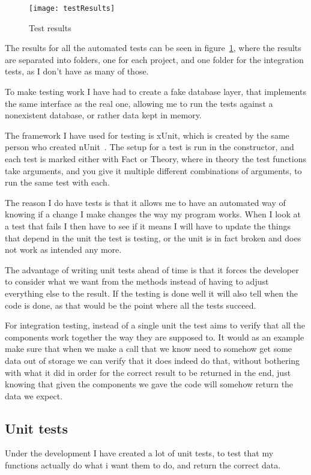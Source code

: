 \begin{figure}[h]
  \centering
  \texttt{[image: testResults]}
  \caption{Test results}
\label{fig:testResults}
\end{figure}

The results for all the automated tests can be seen in
figure~\ref{fig:testResults}, where the results are separated into folders, one
for each project, and one folder for the integration tests, as I don't have as
many of those.

To make testing work I have had to create a fake database layer, that implements
the same interface as the real one, allowing me to run the tests against a
nonexistent database, or rather data kept in memory.

The framework I have used for testing is xUnit, which is created by the same
person who created nUnit~\cite{xunit}. The setup for a test is run in the
constructor, and each test is marked either with Fact or Theory, where in theory
the test functions take arguments, and you give it multiple different
combinations of arguments, to run the same test with each.

The reason I do have tests is that it allows me to have an automated way of
knowing if a change I make changes the way my program works. When I look at a
test that fails I then have to see if it means I will have to update the things
that depend in the unit the test is testing, or the unit is in fact broken and
does not work as intended any more. 

The advantage of writing unit tests ahead of time is that it forces the
developer to consider what we want from the methods instead of having to adjust
everything else to the result. If the testing is done well it will also tell
when the code is done, as that would be the point where all the tests succeed.

For integration testing, instead of a single unit the test aims to verify that
all the components work together the way they are supposed to. It would as an
example make sure that when we make a call that we know need to somehow get some
data out of storage we can verify that it does indeed do that, without bothering
with what it did in order for the correct result to be returned in the end, just
knowing that given the components we gave the code will somehow return the data
we expect.

\subsection{Unit tests}
\label{sec:unit_tests}
Under the development I have created a lot of unit tests, to test that my
functions actually do what i want them to do, and return the correct data.

